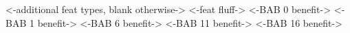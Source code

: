 { <-additional feat types, blank otherwise-> }
{ <-feat fluff-> }
{ <-BAB 0 benefit-> }
{ <-BAB 1 benefit-> }
{ <-BAB 6 benefit-> }
{ <-BAB 11 benefit-> }
{ <-BAB 16 benefit-> }